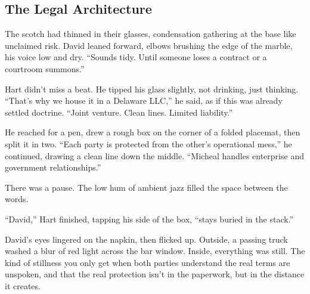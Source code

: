 \medskip

\subsection{The Legal Architecture}

The scotch had thinned in their glasses, condensation gathering at the base like unclaimed risk. David leaned forward, 
elbows brushing the edge of the marble, his voice low and dry. ``Sounds tidy. Until someone loses a contract or a 
courtroom summons.''

Hart didn’t miss a beat. He tipped his glass slightly, not drinking, just thinking. ``That’s why we house it in a 
Delaware LLC,'' he said, as if this was already settled doctrine. ``Joint venture. Clean lines. Limited liability.''

He reached for a pen, drew a rough box on the corner of a folded placemat, then split it in two. ``Each party is 
protected from the other’s operational mess,'' he continued, drawing a clean line down the middle. ``Micheal 
handles enterprise and government relationships.''

There was a pause. The low hum of ambient jazz filled the space between the words.

``David,'' Hart finished, tapping his side of the box, ``stays buried in the stack.''

David’s eyes lingered on the napkin, then flicked up. Outside, a passing truck washed a blur of red light across 
the bar window. Inside, everything was still. The kind of stillness you only get when both parties understand 
the real terms are unspoken, and that the real protection isn’t in the paperwork, but in the distance it creates.

\medskip


